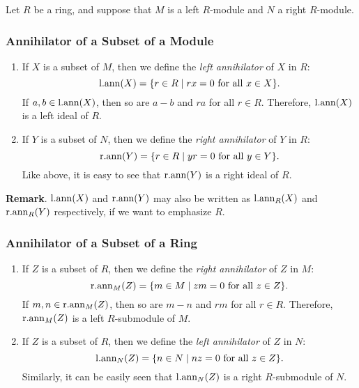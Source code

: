\documentclass{article}
\begin{document}
Let $R$ be a ring, and suppose that $M$ is a left $R$-module and $N$ a right $R$-module.

\subsubsection*{Annihilator of a Subset of a Module}

\begin{enumerate}
\item
If $X$ is a subset of $M$, 
then we define the {\it left annihilator} of $X$ in $R$:
$${\rm l.ann}(X) = \{ r \in R \mid rx = 0 \text{ for all } x \in X \}.$$
If $a,b\in {\rm l.ann}(X)$, then so are $a-b$ and $ra$ for all $r\in R$.  Therefore, ${\rm l.ann}(X)$ is a left ideal of $R$.
\item
If $Y$ is a subset of $N$, 
then we define the {\it right annihilator} of $Y$ in $R$:
$${\rm r.ann}(Y) = \{ r \in R \mid yr = 0 \text{ for all } y \in Y \}.$$
Like above, it is easy to see that ${\rm r.ann}(Y)$ is a right ideal of $R$.
\end{enumerate}

\textbf{Remark}.  ${\rm l.ann}(X)$ and ${\rm r.ann}(Y)$ may also be written as ${\rm l.ann}_R(X)$ and ${\rm r.ann}_R(Y)$ respectively, if we want to emphasize $R$.

\subsubsection*{Annihilator of a Subset of a Ring}

\begin{enumerate}
\item
If $Z$ is a subset of $R$, 
then we define the {\it right annihilator} of $Z$ in $M$:
$${\rm r.ann}_M(Z) = \{ m \in M \mid zm = 0 \text{ for all } z \in Z \}.$$
If $m,n\in {\rm r.ann}_M(Z)$, then so are $m-n$ and $rm$ for all $r\in R$.  Therefore, ${\rm r.ann}_M(Z)$ is a left $R$-submodule of $M$.
\item
If $Z$ is a subset of $R$, 
then we define the {\it left annihilator} of $Z$ in $N$:
$${\rm l.ann}_N(Z) = \{ n \in N \mid nz = 0 \text{ for all } z \in Z \}.$$
Similarly, it can be easily seen that ${\rm l.ann}_N(Z)$ is a right $R$-submodule of $N$.
\end{enumerate}
\end{document}
